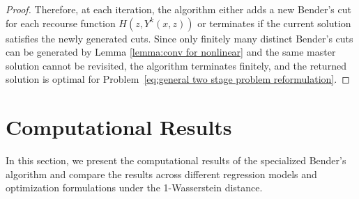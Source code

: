 \documentclass[onefignum,onetabnum]{siamart251216}
\begin{document}
\begin{proof}
Therefore, at each iteration, the algorithm either adds a new Bender's cut for each recourse function $H(z,Y^k(x,z))$ or terminates if the current solution satisfies the newly generated cuts. Since only finitely many distinct Bender's cuts can be generated by Lemma \ref{lemma:conv for nonlinear} and the same master solution cannot be revisited, the algorithm terminates finitely, and the returned solution is optimal for Problem\ \eqref{eq:general two stage problem reformulation}.
\end{proof}

  
\section{Computational Results}\label{sec:experiments}
In this section, we present the computational results of the specialized Bender's algorithm and compare the results across different regression models and optimization formulations under the 1-Wasserstein distance.
\end{document}
